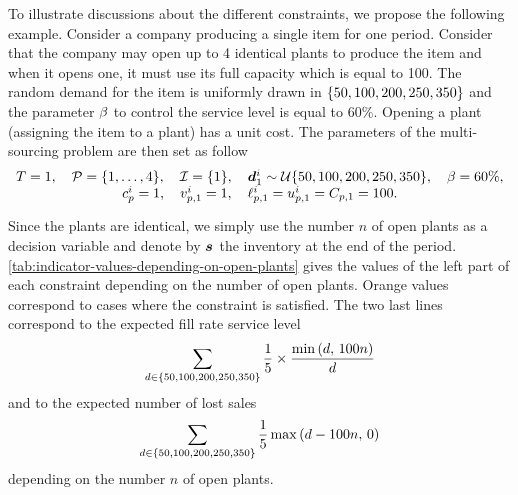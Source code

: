 To illustrate discussions about the different constraints, we propose the following example.
Consider a company producing a single item for one period.
Consider that the company may open up to 4 identical plants to produce the item and when it opens one, it must use its full capacity which is equal to 100.
The random demand for the item is uniformly drawn in $\crbracket{50,100,200,250,350}$ and the parameter $\beta$ to control the service level is equal to $60\%$.
Opening a plant (\ie assigning the item to a plant) has a unit cost.
The parameters of the multi-sourcing problem are then set as follow
\begin{equation}
\begin{array}{c}
  \horizon=1
  ,\quad
  \plants=\range[1]{4}
  ,\quad
  \REF=\crbracket{1}
  ,\quad
  \va\demand_1^i\sim\cU\crbracket{50,100,200,250,350}
  ,\quad
  \servicelvl=60\%,
  \\ \smallskip
  \affect_p^i=1
  ,\quad
  \rate_{p,1}^i=1
  ,\quad
  \lb_{p,1}^i=\ub_{p,1}^i=\capacity_{p,1}=100.
\end{array}
\end{equation}
Since the plants are identical, we simply use the number $n$ of open plants as a decision variable and denote by $\va\inventory$ the inventory at the end of the period.
\cref{tab:indicator-values-depending-on-open-plants} gives the values of the left part of each constraint depending on the number of open plants.
Orange values correspond to cases where the constraint is satisfied.
The two last lines correspond to the expected fill rate service level
\begin{equation}
  \sum_{\demand\in\crbracket{50,100,200,250,350}} \frac{1}{5}\times\frac{\min\bracket{\demand,\,100 n}}{\demand}  
\end{equation}
and to the expected number of lost sales
\begin{equation}
  \sum_{\demand\in\crbracket{50,100,200,250,350}} \frac{1}{5}\max\bracket{\demand-100 n,\,0}  
\end{equation}
depending on the number $n$ of open plants.
